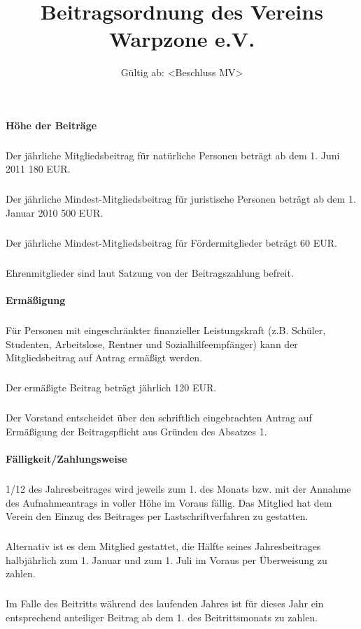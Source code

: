 \documentclass[a4paper]{article}
\title{Beitragsordnung des Vereins Warpzone e.V.}
\date{Gültig ab: <Beschluss MV>}
\begin{document}
\maketitle

\paragraph{Höhe der Beiträge}
\subparagraph{}
Der jährliche Mitgliedsbeitrag für natürliche Personen beträgt ab dem 1.
Juni 2011 180 EUR.
\subparagraph{} Der jährliche Mindest-Mitgliedsbeitrag für juristische Personen beträgt ab
dem 1. Januar 2010 500 EUR.
\subparagraph{} Der jährliche Mindest-Mitgliedsbeitrag für Fördermitglieder beträgt 60 EUR.
\subparagraph{} Ehrenmitglieder sind laut Satzung von der Beitragszahlung befreit.

\paragraph{Ermäßigung}
\subparagraph{} Für Personen mit eingeschränkter finanzieller Leistungskraft (z.B. Schüler,
Studenten, Arbeitslose, Rentner und Sozialhilfeempfänger) kann der
Mitgliedsbeitrag auf Antrag ermäßigt werden.
\subparagraph{} Der ermäßigte Beitrag beträgt jährlich 120 EUR.
\subparagraph{} Der Vorstand entscheidet über den schriftlich eingebrachten Antrag auf
Ermäßigung der Beitragspflicht aus Gründen des Absatzes 1.

\paragraph{Fälligkeit/Zahlungsweise}
\subparagraph{} 1/12 des Jahresbeitrages wird jeweils zum 1. des Monats bzw. mit der
Annahme des Aufnahmeantrags in voller Höhe im Voraus fällig. Das Mitglied
hat dem Verein den Einzug des Beitrages per Lastschriftverfahren zu gestatten.
\subparagraph{} Alternativ ist es dem Mitglied gestattet, die Hälfte seines Jahresbeitrages
halbjährlich zum 1. Januar und zum 1. Juli im Voraus per Überweisung zu
zahlen.
\subparagraph{} Im Falle des Beitritts während des laufenden Jahres ist für dieses Jahr ein
entsprechend anteiliger Beitrag ab dem 1. des Beitrittsmonats zu zahlen.
\end{document}
